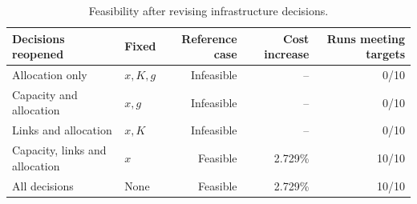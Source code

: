 \begin{table}[H]
\centering\small
\caption{Feasibility after revising infrastructure decisions.}\label{tab:commitment-review}
\begin{tabular}{@{}llrrr@{}}
\toprule
Decisions reopened & Fixed & Reference case & Cost increase & Runs meeting targets \\
\midrule
Allocation only & $x,K,g$ & Infeasible & -- & 0/10 \\
Capacity and allocation & $x,g$ & Infeasible & -- & 0/10 \\
Links and allocation & $x,K$ & Infeasible & -- & 0/10 \\
Capacity, links and allocation & $x$ & Feasible & 2.729\% & 10/10 \\
All decisions & None & Feasible & 2.729\% & 10/10 \\
\bottomrule
\end{tabular}
\end{table}
